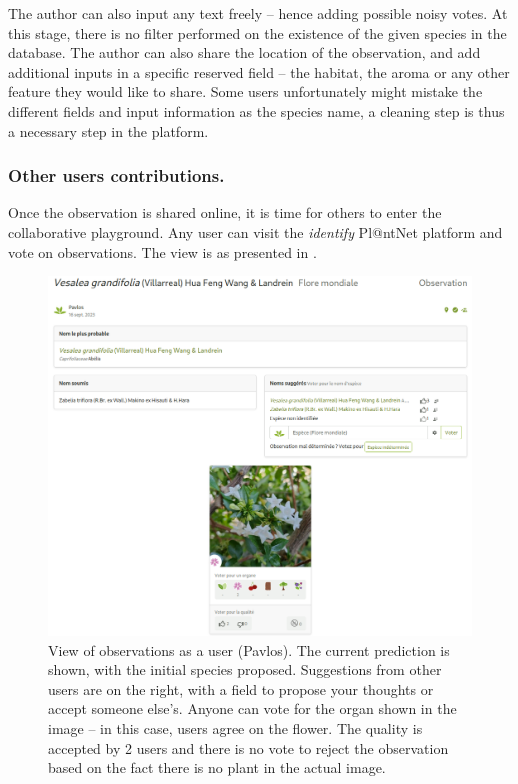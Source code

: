 The author can also input any text freely -- hence adding possible noisy votes.
At this stage, there is no filter performed on the existence of the given species in the database.
The author can also share the location of the observation, and add additional inputs in a specific reserved field -- the habitat, the aroma or any other feature they would like to share.
Some users unfortunately might mistake the different fields and input information as the species name, a cleaning step is thus a necessary step in the platform.

\subsubsection{Other users contributions.}

Once the observation is shared online, it is time for others to enter the collaborative playground.
Any user can visit the \emph{identify} Pl@ntNet platform and vote on observations.
The view is as presented in .

\begin{figure}[tbh]
        \centering
        \includegraphics[width=.85\textwidth]{./images_plantnet/plantnet_others.png}
        \caption{View of observations as a user (\textcopyright Pavlos). The current prediction is shown, with the initial species proposed. Suggestions from other users are on the right, with a field to propose your thoughts or accept someone else's. Anyone can vote for the organ shown in the image -- in this case, users agree on the flower. The quality is accepted by 2 users and there is no vote to reject the observation based on the fact there is no plant in the actual image.}
        \label{fig:others_plantnet}
\end{figure}

